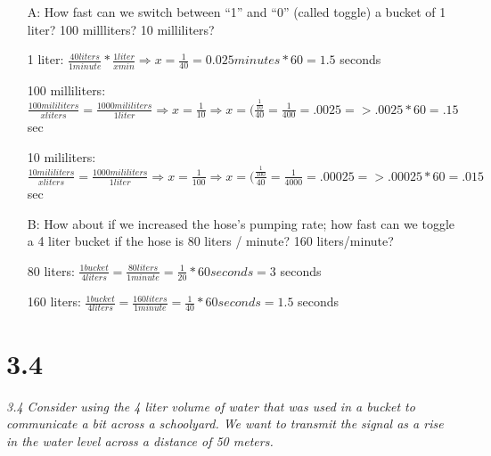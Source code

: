 \documentclass[10pt]{article}
\begin{document}
\begin{itemize}

    \item[A:] How fast can we switch between “1” and “0” (called toggle) a bucket of 1 liter? 100
    millliters? 10 milliliters?

    \item[] 1 liter: $\frac{40 liters}{1 minute} * \frac{1 liter}{x min} \Rightarrow x = \frac{1}{40}= 0.025 minutes * 60 = 1.5$ seconds
    \item[] 100 milliliters: $ \frac{100 mililiters}{x liters} = \frac{1000 mililiters}{1 liter} \Rightarrow x = \frac{1}{10} \Rightarrow x = 
    (\frac{\frac{1}{10}}{40} = \frac{1}{400} = .0025 => .0025 * 60 = .15$ sec
    \item[] 10 mililiters: $ \frac{10 mililiters}{x liters} = \frac{1000 mililiters}{1 liter} \Rightarrow x = \frac{1}{100} \Rightarrow x = 
    (\frac{\frac{1}{100}}{40} = \frac{1}{4000} = .00025 => .00025 * 60 = .015$ sec


    \item[B:] How about if we increased the hose’s pumping rate; how fast can we toggle a 4 liter
    bucket if the hose is 80 liters / minute? 160 liters/minute?

    \item[]  80 liters: $ \frac{1 bucket}{4 liters} = \frac{80 liters}{1 minute} = \frac{1}{20} * 60 seconds = 3$ seconds
    \item[] 160 liters: $ \frac{1 bucket}{4 liters} = \frac{160 liters}{1 minute} = \frac{1}{40} * 60 seconds = 1.5$ seconds
    
\end{itemize}


\section{3.4}

\textit{3.4 Consider using the 4 liter volume of water that was used in a bucket to communicate
a bit across a schoolyard. We want to transmit the signal as a rise in the water level across
a distance of 50 meters.}
\end{document}

